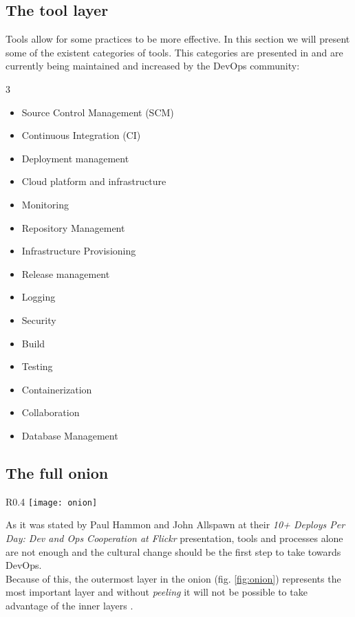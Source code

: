      \subsection{The tool layer} \label{chap:stateoftheart:sec:devops:sec:tools}
      Tools allow for some practices to be more effective. In this section we will present some of the existent categories of tools. This categories are presented in \cite{Labs} and are currently being maintained and increased by the DevOps community:
      \begin{multicols}{3}
        \begin{itemize}
            \item Source Control Management (SCM)
            \item Continuous Integration (CI)
            \item Deployment management
            \item Cloud platform and infrastructure
            \item Monitoring
        \end{itemize}
        \begin{itemize}
            \item Repository Management
            \item Infrastructure Provisioning
            \item Release management
            \item Logging
            \item Security
        \end{itemize}
        \begin{itemize}
            \item Build
            \item Testing
            \item Containerization
            \item Collaboration
            \item Database Management
        \end{itemize}
      \end{multicols}
\pagebreak
      \subsection{The full onion} \label{chap:stateoftheart:sec:devops:sec:onion}
        \begin{wrapfigure}{R}{0.4\textwidth}
            \center
            \texttt{[image: onion]}
            \caption{The DevOps onion \cite{DaveSayers2013}}
            \label{fig:onion}
        \end{wrapfigure}
        As it was stated by Paul Hammon and John Allspawn at their \textit{10+ Deploys Per Day: Dev and Ops Cooperation at Flickr} \cite{Allspaw} presentation, tools and processes alone are not enough and the cultural change should be the first step to take towards DevOps. \\
        Because of this, the outermost layer in the onion (fig. \ref{fig:onion}) represents the most important layer and without \textit{peeling} it will not be possible to take advantage of the  inner layers \cite{Allspaw}.

